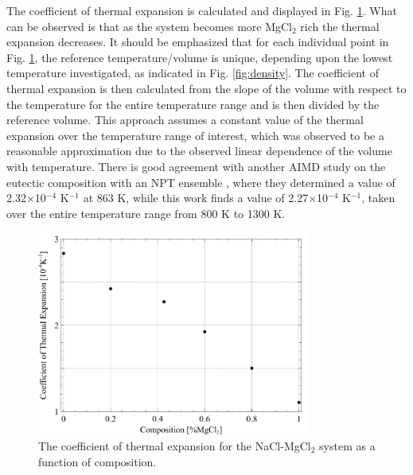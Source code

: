\documentclass[review]{elsarticle}
\begin{document}
The coefficient of thermal expansion is calculated and displayed in Fig. \ref{fig:CTE}. What can be observed is that as the system becomes more MgCl$_2$ rich the thermal expansion decreases. It should be emphasized that for each individual point in Fig. \ref{fig:CTE}, the reference temperature/volume is unique, depending upon the lowest temperature investigated, as indicated in Fig. \ref{fig:density}. The coefficient of thermal expansion is then calculated from the slope of the volume with respect to the temperature for the entire temperature range and is then divided by the reference volume. This approach assumes a constant value of the thermal expansion over the temperature range of interest, which was observed to be a reasonable approximation due to the observed linear dependence of the volume with temperature. There is good agreement with another AIMD study on the eutectic composition with an NPT ensemble \cite{XU2020568}, where they determined a value of 2.32$\times$10$^{-4}$ K$^{-1}$ at 863 K, while this work finds a value of 2.27$\times$10$^{-4}$ K$^{-1}$, taken over the entire temperature range from 800 K to 1300 K. 

\begin{figure}[h]
 \centering
 \includegraphics[width=0.8\textwidth]{images/CTE.jpg} 
 \caption{The coefficient of thermal expansion for the NaCl-MgCl$_{2}$ system as a function of composition.}
 \label{fig:CTE}
\end{figure} 
\FloatBarrier
\end{document}

